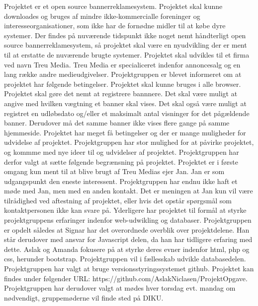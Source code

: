 \documentclass[a4paper,12pt]{article}
\begin{document}
Projektet er et open source bannerreklamesystem. Projektet skal kunne downloades og bruges af mindre ikke-kommercialle foreninger og interesseorganisationer, som ikke har de fornødne midler til at købe dyre systemer. Der findes på nuværende tidspunkt ikke noget nemt håndterligt open source bannerreklamesystem, så projektet skal være en nyudvikling der er ment til at erstatte de nuværende brugte systemer. Projektet skal udvikles til et firma ved navn Treu Media. Treu Media er specialiceret indenfor annoncesalg og en lang række andre medieudgivelser. 
\newline
\newline
Projektgruppen er blevet informeret om at projektet har følgende betingelser. Projektet  skal kunne bruges i alle browser. Projektet skal gøre det nemt at registrere bannnere. Det skal være muligt at angive med hvilken vægtning et banner skal vises. Det skal også være muligt at registret en udløbsdato og/eller et maksimalt antal visninger for det pågældende banner. Derudover må det samme banner ikke vises flere gange på samme hjemmeside. 
Projektet har meget få betingelser og der er mange muligheder for udvidelse af projektet. Projektgruppen har stor mulighed for at påvirke projektet, og kommme med nye ideer til og udvidelser af projektet.
Projektgruppen har derfor valgt at sætte følgende begrænsning på projektet. Projektet er i første omgang kun ment til at blive brugt af Treu Medias ejer Jan. Jan er som udgangspunkt den eneste interessent.
\newline
\newline
Projektgruppen har endnu ikke haft et møde med Jan, men med en anden kontakt. Det er meningen at Jan kun vil være tilrådighed ved aftestning af projektet, eller hvis det opstår spørgsmål som kontaktpersonen ikke kan svare på. 
\newline
\newline
Yderligere har projektet til formål at styrke projektgruppens erfaringer indenfor web-udwikling og databaser.
Projektgruppen er opdelt således at Signar har det overordnede overblik over projektdelene. Han står derudover med ansvar for Javascript delen, da han har tidligere erfaring med dette. Aslak og Amanda fokusere på at styrke deres evner indenfor html, php og css, herunder bootstrap. Projektgruppen vil i fællesskab udvikle databasedelen.
\newline
\newline
Projektgruppen har valgt at bruge versionsstyringssystemet github. 
Projektet kan findes under følgender URL: https://github.com/AslakNiclasen/ProjektOpgave. Projektgruppen har derudover valgt at mødes hver torsdag evt. mandag om nødvendigt, gruppemøderne vil finde sted på DIKU. 
\newline
\newline 
\end{document}
